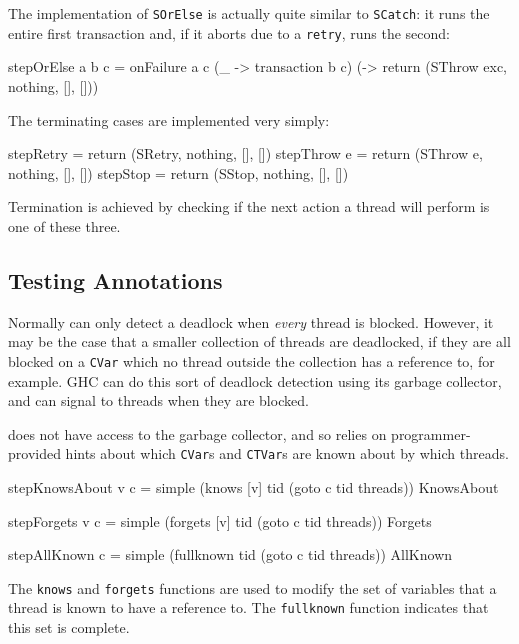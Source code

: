 The implementation of \verb|SOrElse| is actually quite similar to
\verb|SCatch|: it runs the entire first transaction and, if it aborts
due to a \verb|retry|, runs the second:

\begin{haskellcode}
stepOrElse a b c = onFailure a c
  (\_   -> transaction b c)
  (\exc -> return (SThrow exc, nothing, [], []))
\end{haskellcode}

The terminating cases are implemented very simply:

\begin{haskellcode}
stepRetry   = return (SRetry,   nothing, [], [])
stepThrow e = return (SThrow e, nothing, [], [])
stepStop    = return (SStop,    nothing, [], [])
\end{haskellcode}

Termination is achieved by checking if the next action a thread will
perform is one of these three.

\subsection{Testing Annotations}
\label{sec:execution-stepwise-annotations}

Normally \dejafu{} can only detect a deadlock when \emph{every} thread
is blocked. However, it may be the case that a smaller collection of
threads are deadlocked, if they are all blocked on a \verb|CVar| which
no thread outside the collection has a reference to, for example. GHC
can do this sort of deadlock detection using its garbage collector,
and can signal to threads when they are blocked.

\dejafu{} does not have access to the garbage collector, and so relies
on programmer-provided hints about which \verb|CVar|s and
\verb|CTVar|s are known about by which threads.

\begin{haskellcode}
stepKnowsAbout v c = simple
  (knows   [v] tid (goto c tid threads)) KnowsAbout

stepForgets    v c = simple
  (forgets [v] tid (goto c tid threads)) Forgets

stepAllKnown     c = simple
  (fullknown   tid (goto c tid threads)) AllKnown
\end{haskellcode}

The \verb|knows| and \verb|forgets| functions are used to modify the
set of variables that a thread is known to have a reference to. The
\verb|fullknown| function indicates that this set is complete.

